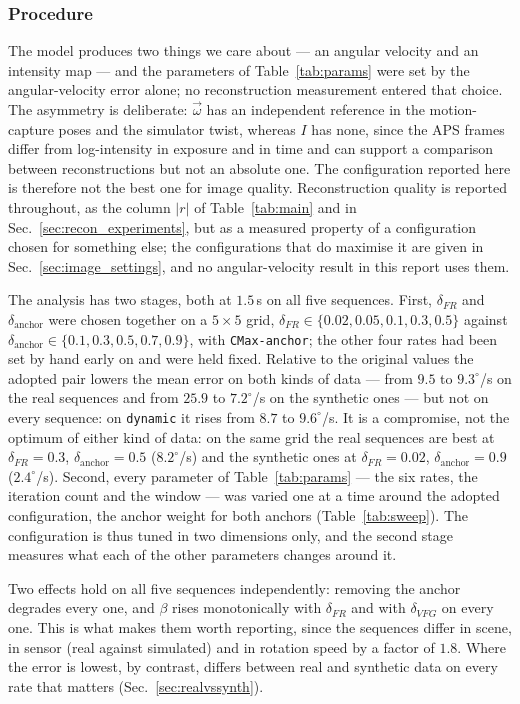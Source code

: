 \documentclass[journal]{IEEEtran}
\newcommand{\Imap}{I}
\newcommand{\wvec}{\vec{\omega}}
\begin{document}
\subsubsection{Procedure}
\label{sec:objective}
The model produces two things we care about --- an angular velocity and an
intensity map --- and the parameters of Table~\ref{tab:params} were set by the
angular-velocity error alone; no reconstruction measurement entered that
choice. The asymmetry is deliberate: $\wvec$ has an independent reference in
the motion-capture poses and the simulator twist, whereas $\Imap$ has none,
since the APS frames differ from log-intensity in exposure and in time and can
support a comparison between reconstructions but not an absolute one. The
configuration reported here is therefore not the best one for image quality.
Reconstruction quality is reported throughout, as the column $|r|$ of
Table~\ref{tab:main} and in Sec.~\ref{sec:recon_experiments}, but as a measured
property of a configuration chosen for something else; the configurations that
do maximise it are given in Sec.~\ref{sec:image_settings}, and no
angular-velocity result in this report uses them.

The analysis has two stages, both at $1.5$\,s on all five sequences. First,
$\delta_{F\!R}$ and $\delta_{\text{anchor}}$ were chosen together on a
$5\times5$ grid, $\delta_{F\!R} \in \{0.02, 0.05, 0.1, 0.3, 0.5\}$ against
$\delta_{\text{anchor}} \in \{0.1, 0.3, 0.5, 0.7, 0.9\}$, with
\texttt{CMax-anchor}; the other four rates had been set by hand early on and
were held fixed. Relative to the original values the adopted pair lowers the
mean error on both kinds of data --- from $9.5$ to $9.3^\circ$/s on the real
sequences and from $25.9$ to $7.2^\circ$/s on the synthetic ones --- but not on
every sequence: on \texttt{dynamic} it rises from $8.7$ to $9.6^\circ$/s. It is
a compromise, not the optimum of either kind of data: on the same grid the real
sequences are best at $\delta_{F\!R} = 0.3$, $\delta_{\text{anchor}} = 0.5$
($8.2^\circ$/s) and the synthetic ones at $\delta_{F\!R} = 0.02$,
$\delta_{\text{anchor}} = 0.9$ ($2.4^\circ$/s). Second, every parameter of
Table~\ref{tab:params} --- the six rates, the iteration count and the window
--- was varied one at a time around the adopted configuration, the anchor
weight for both anchors (Table~\ref{tab:sweep}). The configuration is thus
tuned in two dimensions only, and the second stage measures what each of the
other parameters changes around it.

Two effects hold on all five sequences independently: removing the anchor
degrades every one, and $\beta$ rises monotonically with $\delta_{F\!R}$ and
with $\delta_{V\!F\!G}$ on every one. This is what makes them worth reporting,
since the sequences differ in scene, in sensor (real against simulated) and in
rotation speed by a factor of $1.8$. Where the error is lowest, by contrast,
differs between real and synthetic data on every rate that matters
(Sec.~\ref{sec:realvssynth}).
\end{document}
